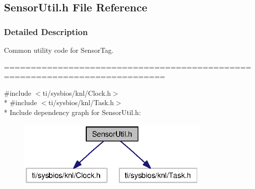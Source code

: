 \subsection{Sensor\+Util.\+h File Reference}
\label{_sensor_util_8h}


\subsubsection{Detailed Description}
Common utility code for Sensor\+Tag. 

============================================================================



{\ttfamily \#include $<$ti/sysbios/knl/\+Clock.\+h$>$}\\*
{\ttfamily \#include $<$ti/sysbios/knl/\+Task.\+h$>$}\\*
Include dependency graph for Sensor\+Util.\+h\+:
\nopagebreak
\begin{figure}[H]
\begin{center}
\leavevmode
\includegraphics[width=267pt]{_sensor_util_8h__incl}
\end{center}
\end{figure}
